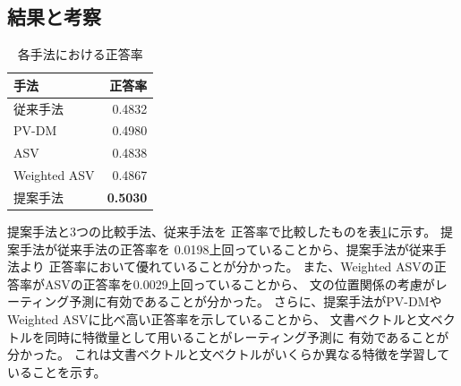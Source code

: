 \documentclass{ttisummary}
\begin{document}


\subsection{結果と考察}

\begin{table}[b!]
  \caption{各手法における正答率}
  \centering
  \begin{tabular}{l | r} \label{tab:Accuracies}
    手法 & 正答率 \\
    \hline
    従来手法\cite{fujitani15}  & 0.4832 \\
    PV-DM & 0.4980 \\
    ASV & 0.4838 \\
    Weighted ASV & 0.4867 \\
    提案手法 & \textbf{0.5030} \\
  \end{tabular}
\end{table}

提案手法と3つの比較手法、従来手法\cite{fujitani15}を
正答率で比較したものを表\ref{tab:Accuracies}に示す。
提案手法が従来手法\cite{fujitani15}の正答率を
0.0198上回っていることから、提案手法が従来手法\cite{fujitani15}より
正答率において優れていることが分かった。
また、Weighted ASVの正答率がASVの正答率を0.0029上回っていることから、
文の位置関係の考慮がレーティング予測に有効であることが分かった。
さらに、提案手法がPV-DMやWeighted ASVに比べ高い正答率を示していることから、
文書ベクトルと文ベクトルを同時に特徴量として用いることがレーティング予測に
有効であることが分かった。
これは文書ベクトルと文ベクトルがいくらか異なる特徴を学習していることを示す。
\end{document}

